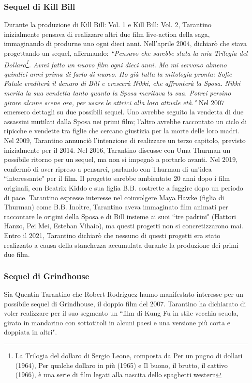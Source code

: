 \documentclass[12pt]{article} %
\begin{document}
\begin{flushleft}
\subsubsection*{Sequel di Kill Bill}
Durante la produzione di Kill Bill: Vol. 1 e Kill Bill: Vol. 2, Tarantino inizialmente pensava di realizzare altri due film live-action della saga, immaginando di produrne uno ogni dieci anni. Nell'aprile 2004, dichiarò che stava progettando un sequel, affermando:  
\textit{``Pensavo che sarebbe stata la mia Trilogia del Dollaro\footnote{La Trilogia del dollaro di Sergio Leone, composta da Per un pugno di dollari (1964), Per qualche dollaro in più (1965) e Il buono, il brutto, il cattivo (1966), è una serie di film legati alla nascita dello spaghetti western}. Avrei fatto un nuovo film ogni dieci anni. Ma mi servono almeno quindici anni prima di farlo di nuovo. Ho già tutta la mitologia pronta: Sofie Fatale erediterà il denaro di Bill e crescerà Nikki, che affronterà la Sposa. Nikki merita la sua vendetta tanto quanto la Sposa meritava la sua. Potrei persino girare alcune scene ora, per usare le attrici alla loro attuale età."} Nel 2007 emersero dettagli su due possibili sequel. Uno avrebbe seguito la vendetta di due assassini mutilati dalla Sposa nei primi film; l'altro avrebbe raccontato un ciclo di ripicche e vendette tra figlie che cercano giustizia per la morte delle loro madri.   
Nel 2009, Tarantino annunciò l'intenzione di realizzare un terzo capitolo, previsto inizialmente per il 2014.  
Nel 2016, Tarantino discusse con Uma Thurman un possibile ritorno per un sequel, ma non si impegnò a portarlo avanti. Nel 2019, confermò di aver ripreso a pensarci, parlando con Thurman di un’idea ``interessante" per il film. Il progetto sarebbe ambientato 20 anni dopo i film originali, con Beatrix Kiddo e sua figlia B.B. costrette a fuggire dopo un periodo di pace. 
Tarantino espresse interesse nel coinvolgere Maya Hawke (figlia di Thurman) come B.B.  
Inoltre, Tarantino aveva immaginato film animati per raccontare le origini della Sposa e di Bill insieme ai suoi ``tre padrini" (Hattori Hanzo, Pei Mei, Esteban Vihaio), ma questi progetti non si concretizzarono mai.  
Entro il 2021, Tarantino dichiarò che nessuno di questi progetti era stato realizzato a causa della stanchezza accumulata durante la produzione dei primi due film.
\subsubsection*{Sequel di Grindhouse}
Sia Quentin Tarantino che Robert Rodriguez hanno manifestato interesse per un possibile sequel di Grindhouse, il doppio film del 2007. Tarantino ha dichiarato di voler realizzare per il suo segmento un ``film di Kung Fu in stile vecchia scuola, girato in mandarino con sottotitoli in alcuni paesi e una versione più corta e doppiata in altri".

\end{flushleft}
\end{document}
